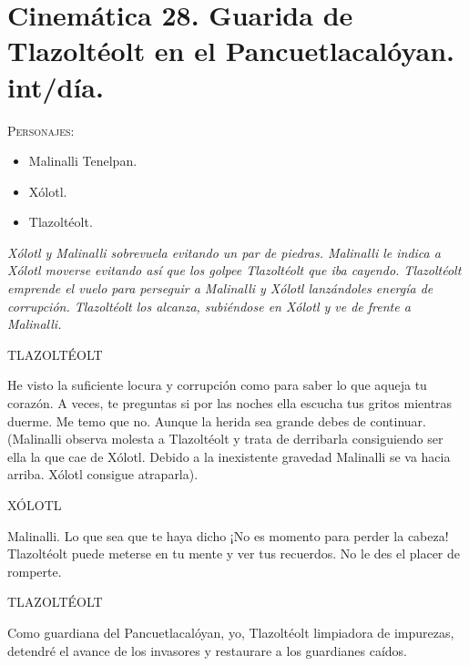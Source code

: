 \documentclass[11pt,letterpaper]{article}
\begin{document}
\section{Cinemática 28. Guarida de Tlazoltéolt en el Pancuetlacalóyan. int/día.}
 \textsc{Personajes}:
 \begin{itemize}
 \item Malinalli Tenelpan.
\item Xólotl.
\item Tlazoltéolt.
 \end{itemize}
\textit{Xólotl y Malinalli sobrevuela evitando un par de piedras. Malinalli le indica a Xólotl moverse evitando así que los golpee Tlazoltéolt que iba cayendo. Tlazoltéolt emprende el vuelo para perseguir a Malinalli y Xólotl lanzándoles energía de corrupción. Tlazoltéolt los alcanza, subiéndose en Xólotl y ve de frente a Malinalli.}
\begin{center}
TLAZOLTÉOLT
\\
\par
He visto la suficiente locura y corrupción como para saber lo que aqueja tu corazón. A veces, te preguntas si por las noches ella escucha tus gritos mientras duerme. Me temo que no. Aunque la herida sea grande debes de continuar. (Malinalli observa molesta a Tlazoltéolt y trata de derribarla consiguiendo ser ella la que cae de Xólotl. Debido a la inexistente gravedad Malinalli se va hacia arriba. Xólotl consigue atraparla). 
\\
\par
XÓLOTL
\\
\par
Malinalli. Lo que sea que te haya dicho ¡No es momento para perder la cabeza! Tlazoltéolt puede meterse en tu mente y ver tus recuerdos. No le des el placer de romperte.
\\
\par
TLAZOLTÉOLT
\\
\par
Como guardiana del Pancuetlacalóyan, yo, Tlazoltéolt limpiadora de impurezas, detendré el avance de los invasores y restaurare a los guardianes caídos.
\end{center}
\end{document}
